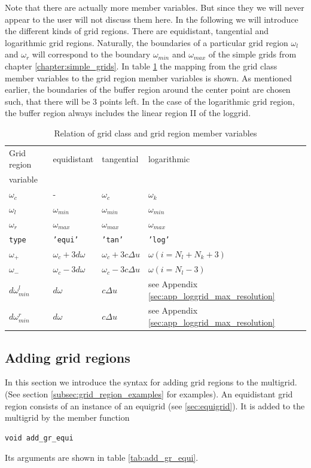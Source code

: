Note that there are actually more member variables. But since they we will never appear to the user will not discuss them here. In the following we will introduce the different kinds of grid regions. There are equidistant, tangential and logarithmic grid regions. Naturally, the boundaries of a particular grid region $\omega_l$ and $\omega_r$ will correspond to the boundary $\omega_{min}$ and $\omega_{max}$ of the simple grids from chapter \ref{chapter:simple_grids}. In table \ref{tab:grid_region_types} the mapping from the grid class member variables to the grid region member variables is shown. As mentioned earlier, the boundaries of the buffer region around the center point are chosen such, that there will be 3 points left. In the case of the logarithmic grid region, the buffer region always includes the linear region II of the loggrid.
\begin{table}[h]
	\begin{center}
		\begin{tabular}{llll}
		Grid region & equidistant & tangential & logarithmic  \\ 
		variable    &             &            &              \\
		\hline 
		$\omega_c$    & -               & $\omega_c$     & $\omega_k$     \\
		$\omega_l$    & $\omega_{min}$  & $\omega_{min}$ & $\omega_{min}$ \\
		$\omega_r$    & $\omega_{max}$  & $\omega_{max}$ & $\omega_{max}$ \\
		\texttt{type} & \texttt{'equi'} & \texttt{'tan'} & \texttt{'log'} \\
		$\omega_+$         & $\omega_c+3d\omega$ & $\omega_c+3c\Delta u$ & $\omega(i=N_l+N_k+3)$ \\
		$\omega_-$         & $\omega_c-3d\omega$ & $\omega_c-3c\Delta u$ & $\omega(i=N_l-3)$  \\
		$d\omega_{min}^l$  & $d\omega$ & $c\Delta u$ & see Appendix \ref{sec:app_loggrid_max_resolution} \\
		$d\omega_{min}^r$  & $d\omega$ & $c\Delta u$ & see Appendix \ref{sec:app_loggrid_max_resolution} \\
		\end{tabular}
	\end{center}
	\caption{Relation of grid class and grid region member variables}
	\label{tab:grid_region_types}
\end{table}

\subsection{Adding grid regions}\label{subsec:grid_region_adding}
In this section we introduce the syntax for adding grid regions to the multigrid. (See section \ref{subsec:grid_region_examples} for examples).
An equidistant grid region consists of an instance of an equigrid (see \ref{sec:equigrid}). It is added to the multigrid by the member function 
\begin{lstlisting}
void add_gr_equi
\end{lstlisting}
Its arguments are shown in table \ref{tab:add_gr_equi}.

